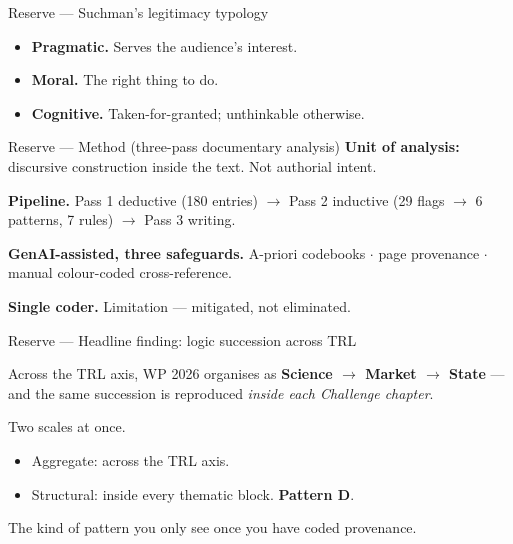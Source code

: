 \documentclass[aspectratio=169,hyperref={pdfpagelabels=false}]{beamer}
\begin{document}
\begin{frame}{Reserve — Suchman's legitimacy typology}
    \begin{itemize}
        \item \textbf{Pragmatic.} Serves the audience's interest.
        \item \textbf{Moral.} The right thing to do.
        \item \textbf{Cognitive.} Taken-for-granted; unthinkable otherwise.
    \end{itemize}
\end{frame}

\begin{frame}{Reserve — Method (three-pass documentary analysis)}
    \textbf{Unit of analysis:} discursive construction inside the text. Not authorial intent.

    \vspace{3mm}
    \textbf{Pipeline.} Pass 1 deductive (180 entries) $\to$ Pass 2 inductive (29 flags $\to$ 6 patterns, 7 rules) $\to$ Pass 3 writing.

    \vspace{3mm}
    \textbf{GenAI-assisted, three safeguards.} A-priori codebooks $\cdot$ page provenance $\cdot$ manual colour-coded cross-reference.

    \vspace{3mm}
    \textbf{Single coder.} Limitation — mitigated, not eliminated.
\end{frame}

\begin{frame}{Reserve — Headline finding: logic succession across TRL}
    \begin{block}{}
        Across the TRL axis, WP 2026 organises as \textbf{Science $\to$ Market $\to$ State} — and the same succession is reproduced \emph{inside each Challenge chapter}.
    \end{block}
    \vspace{3mm}
    Two scales at once.
    \begin{itemize}
        \item Aggregate: across the TRL axis.
        \item Structural: inside every thematic block. \textbf{Pattern D}.
    \end{itemize}
    \vspace{2mm}
    \footnotesize The kind of pattern you only see once you have coded provenance.
\end{frame}
\end{document}
